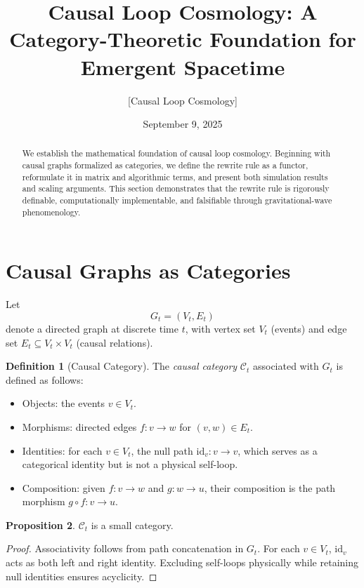 \documentclass[11pt]{article}
\title{Causal Loop Cosmology: A Category-Theoretic Foundation for Emergent Spacetime}
\author{[Causal Loop Cosmology]}
\date{September 9, 2025}
\theoremstyle{definition}
\newtheorem{definition}{Definition}[section]
\newtheorem{proposition}[definition]{Proposition}
\begin{document}
\maketitle

\begin{abstract}
We establish the mathematical foundation of causal loop cosmology. Beginning with causal graphs formalized as categories, we define the rewrite rule as a functor, reformulate it in matrix and algorithmic terms, and present both simulation results and scaling arguments. This section demonstrates that the rewrite rule is rigorously definable, computationally implementable, and falsifiable through gravitational-wave phenomenology.
\end{abstract}

\tableofcontents

\section{Causal Graphs as Categories}

Let
\[
G_t = (V_t, E_t)
\]
denote a directed graph at discrete time $t$, with vertex set $V_t$ (events) and edge set $E_t \subseteq V_t \times V_t$ (causal relations).

\begin{definition}[Causal Category]
The \emph{causal category} $\mathcal{C}_t$ associated with $G_t$ is defined as follows:
\begin{itemize}
    \item Objects: the events $v \in V_t$.
    \item Morphisms: directed edges $f : v \to w$ for $(v,w) \in E_t$.
    \item Identities: for each $v \in V_t$, the null path $\mathrm{id}_v : v \to v$, which serves as a categorical identity but is not a physical self-loop.
    \item Composition: given $f : v \to w$ and $g : w \to u$, their composition is the path morphism $g \circ f : v \to u$.
\end{itemize}
\end{definition}

\begin{proposition}
$\mathcal{C}_t$ is a small category.
\end{proposition}

\begin{proof}
Associativity follows from path concatenation in $G_t$. For each $v \in V_t$, $\mathrm{id}_v$ acts as both left and right identity. Excluding self-loops physically while retaining null identities ensures acyclicity.
\end{proof}
\end{document}
